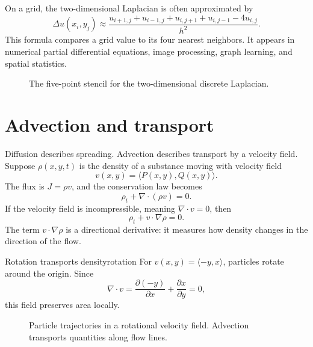 \documentclass[11pt]{article}
\newcommand{\grad}{\nabla}
\newcommand{\Div}{\nabla\!\cdot}
\newcommand{\Lap}{\Delta}
\begin{document}
On a grid, the two-dimensional Laplacian is often approximated by
\[
\Lap u(x_i,y_j)\approx \frac{u_{i+1,j}+u_{i-1,j}+u_{i,j+1}+u_{i,j-1}-4u_{i,j}}{h^2}.
\]
This formula compares a grid value to its four nearest neighbors. It appears in numerical partial differential equations, image processing, graph learning, and spatial statistics.

\begin{figure}[H]
\centering
{}
\caption{The five-point stencil for the two-dimensional discrete Laplacian.}
\end{figure}

\section{Advection and transport}

Diffusion describes spreading. Advection describes transport by a velocity field. Suppose $\rho(x,y,t)$ is the density of a substance moving with velocity field
\[
v(x,y)=\langle P(x,y),Q(x,y)\rangle.
\]
The flux is $J=\rho v$, and the conservation law becomes
\[
\rho_t+\Div(\rho v)=0.
\]
If the velocity field is incompressible, meaning $\Div v=0$, then
\[
\rho_t+v\cdot\grad \rho=0.
\]
The term $v\cdot\grad\rho$ is a directional derivative: it measures how density changes in the direction of the flow.

\begin{examplebox}{Rotation transports density}{rotation}
For $v(x,y)=\langle -y,x\rangle$, particles rotate around the origin. Since
\[
\Div v=\frac{\partial(-y)}{\partial x}+\frac{\partial x}{\partial y}=0,
\]
this field preserves area locally.
\end{examplebox}

\begin{figure}[H]
\centering
{}
\caption{Particle trajectories in a rotational velocity field. Advection transports quantities along flow lines.}
\end{figure}
\end{document}
